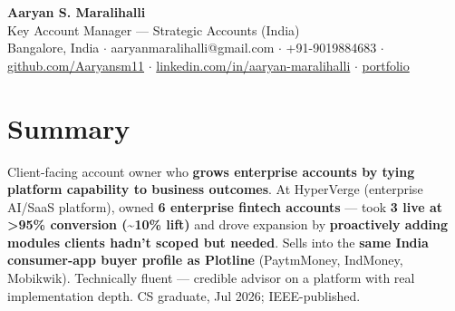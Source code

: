\documentclass[10pt,a4paper]{article}
\begin{document}
\vspace*{-1cm}
\begin{center}
{\LARGE\bfseries Aaryan S. Maralihalli}\\[0.5em]
{\large Key Account Manager --- Strategic Accounts (India)}\\[0.3em]
Bangalore, India $\cdot$ aaryanmaralihalli@gmail.com $\cdot$ +91-9019884683 $\cdot$ \href{https://github.com/Aaryansm11}{github.com/Aaryansm11} $\cdot$ \href{https://linkedin.com/in/aaryan-maralihalli}{linkedin.com/in/aaryan-maralihalli} $\cdot$ \href{https://portfolio-zeta-ten-85.vercel.app}{portfolio}
\end{center}\vspace{0.4ex}
\section*{Summary}
Client-facing account owner who \textbf{grows enterprise accounts by tying platform capability to business outcomes}. At HyperVerge (enterprise AI/SaaS platform), owned \textbf{6 enterprise fintech accounts} --- took \textbf{3 live at \textgreater{}95\% conversion (\textasciitilde{}10\% lift)} and drove expansion by \textbf{proactively adding modules clients hadn't scoped but needed}. Sells into the \textbf{same India consumer-app buyer profile as Plotline} (PaytmMoney, IndMoney, Mobikwik). Technically fluent --- credible advisor on a platform with real implementation depth. CS graduate, Jul 2026; IEEE-published.\par\vspace{2pt}
\end{document}
